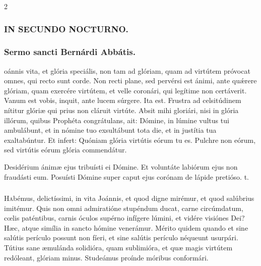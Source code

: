 \documentclass[9pt,twoside]{extarticle}
\begin{document}
\begin{multicols}{2}
\begin{tightlist}{}
\item {}
\end{tightlist}
\subsubsection*{\center \textsc{IN SECUNDO NOCTURNO.}}
\subsubsection*{\center Sermo sancti Bernárdi Abbátis.}
\begin{center}\end{center}
oánnis vita, et glória speciális, non tam ad glóriam, quam ad virtútem próvocat omnes, qui recto sunt corde. Non recti plane, sed pervérsi est ánimi, ante quǽrere glóriam, quam exercére virtútem, et velle coronári, qui legítime non certáverit. Vanum est vobis, inquit, ante lucem súrgere. Ita est. Frustra ad celsitúdinem nítitur glóriæ qui prius non cláruit virtúte. Absit mihi gloriári, nisi in glória illórum, quibus Prophéta congrátulans, ait: Dómine, in lúmine vultus tui ambulábunt, et in nómine tuo exsultábunt tota die, et in justítia tua exaltabúntur. Et infert: Quóniam glória virtútis eórum tu es. Pulchre non eórum, sed virtútis eórum glória commendátur.

\begin{tightlist}{}
\item {} Desidérium ánimæ ejus tribuísti ei Dómine. \textred{*} Et voluntáte labiórum ejus non fraudásti eum.  Posuísti Dómine super caput ejus corónam de lápide pretióso. t.
\end{tightlist}

\subsubsection*{\center{}}
\lettrine{H}abémus, delictíssimi, in vita Joánnis, et quod digne mirémur, et quod salúbrius imitémur. Quis non omni admiratióne stupéndum ducat, carne circúmdatum, cœlis paténtibus, carnis óculos supérno infígere lúmini, et vidére visiónes Dei? Hæc, atque simília in sancto hómine venerámur. Mérito quidem quando et sine salútis perículo possunt non fíeri, et sine salútis perículo néqueunt usurpári. Tútius sane æmulánda solidióra, quam sublimióra, et quæ magis virtútem redóleant, glóriam minus. Studeámus proínde móribus conformári.


\end{multicols}
\end{document}
